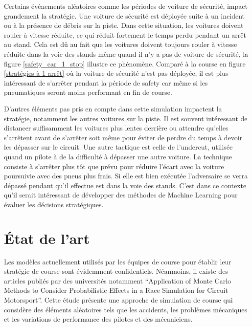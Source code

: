 
Certains événements aléatoires comme les périodes de voiture de sécurité, impact grandement la stratégie. Une voiture de sécurité est déployée suite à un incident ou à la présence de débris sur la piste.
Dans cette situation, les voitures doivent rouler à vitesse réduite, ce qui réduit fortement le temps perdu pendant un arrêt au stand.
Cela est dû au fait que les voitures doivent toujours rouler à vitesse réduite dans la voie des stands même quand il n'y a pas de voiture de sécurité, la figure \ref{safety_car_1_stop} illustre ce phénomène.
Comparé à la course en figure \ref{stratégies à 1 arrêt} où la voiture de sécurité n'est pas déployée, il est plus intéressant de s'arrêter pendant la période de safety car même si les pneumatiques seront moins performant en fin de course.

D'autres éléments pas pris en compte dans cette simulation impactent la stratégie, notamment les autres voitures sur la piste.
Il est souvent intéressant de distancer suffisamment les voitures plus lentes derrière ou attendre qu'elles s'arrêtent avant de s'arrêter soit même pour éviter de perdre du temps à devoir les dépasser sur le circuit.
Une autre tactique est celle de l'undercut, utilisée quand un pilote à de la difficulté à dépasser une autre voiture. La technique consiste à s'arrêter plus tôt que prévu pour réduire l'écart avec la voiture poursuivie avec des pneus plus frais.
Si elle est bien exécutée l'adversaire se verra dépassé pendant qu'il effectue est dans la voie des stands.
C'est dans ce contexte qu'il serait intéressant de développer des méthodes de Machine Learning pour évaluer les décisions stratégiques.
\section{État de l'art}
Les modèles actuellement utilisés par les équipes de course pour établir leur stratégie de course sont évidemment confidentiels.
Néanmoins, il existe des articles publiés par des universités notamment “Application of Monte Carlo Methods to Consider Probabilistic Effects in a Race Simulation for Circuit Motorsport”. \cite{app10124229}
Cette étude présente une approche de simulation de course qui considère des éléments aléatoires tels que les accidents, les problèmes mécaniques
et les variations de performance des pilotes et des mécaniciens.

